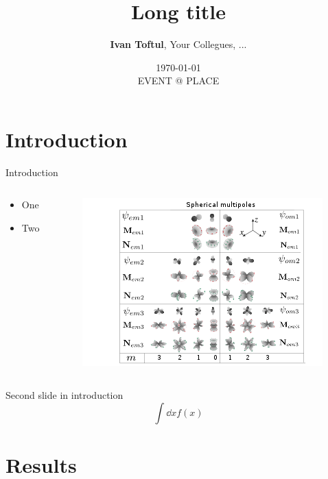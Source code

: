 \documentclass[
aspectratio=169,
16pt,
xcolor={dvipsnames} %
]{beamer}
\title[Short title]{\textbf{Long title}}
\author[Ivan Toftul]{
	\textbf{Ivan Toftul}, 
	Your Collegues, ...
}
\institute[ANU]{
	Australian National University \\ 
	\medskip
	\texttt{toftul.ivan@gmail.com} 
}
\date{
	\small{\today \\ EVENT @ PLACE}
}
\begin{document}
	
\begin{frame}
	\titlepage 
\end{frame}

\section{Introduction}

\begin{frame}[c]{Introduction}
	\begin{columns}
		\begin{column}{0.4\linewidth}
			\begin{itemize}
				\item One
				\item Two
			\end{itemize}
		\end{column}
		\begin{column}{0.6\linewidth}
			\begin{figure}
				\includegraphics[width=1.0\linewidth]{fig/VSHwiki}
			\end{figure}
		\end{column}
	\end{columns}
\end{frame}

\begin{frame}[c]{Second slide in introduction}
	\[
		\int \dd x f(x)
	\]
\end{frame}



\section{Results}
\end{document}
